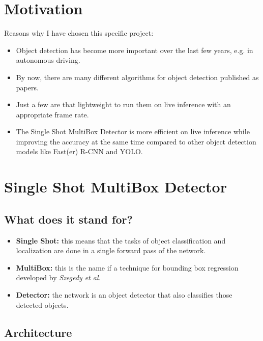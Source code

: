 \documentclass[a0, portrait]{a0poster}
\begin{document}
\vspace{1cm}

\begin{multicols}{3}


\color{Black}

\section*{Motivation}

Reasons why I have chosen this specific project:
\begin{itemize}
  \item Object detection has become more important over the last few years, e.g. in autonomous driving.
  \item By now, there are many different algorithms for object detection published as papers.
  \item Just a few are that lightweight to run them on live inference with an appropriate frame rate.
  \item The Single Shot MultiBox Detector is more efficient on live inference while improving the accuracy at the same time compared to other object detection models like Fast(er) R-CNN and YOLO.
\end{itemize}


\section*{Single Shot MultiBox Detector}

\subsection*{What does it stand for?}

\begin{itemize}
  \item \textbf{Single Shot:} this means that the tasks of object classification and localization are done in a single forward pass of the network.
  \item \textbf{MultiBox:} this is the name if a technique for bounding box regression developed by \textit{Szegedy et al.}
  \item \textbf{Detector:} the network is an object detector that also classifies those detected objects.
\end{itemize}

\subsection*{Architecture}


\end{multicols}
\end{document}
